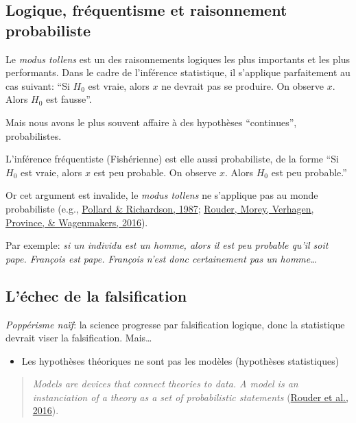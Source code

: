 \documentclass[
  a4paper,11pt,twoside,onecolumn,openright,final,oldfontcommands]{memoir}
\providecommand{\tightlist}{%
  \setlength{\itemsep}{0pt}\setlength{\parskip}{0pt}}
\theoremstyle{definition}
\theoremstyle{definition}
\theoremstyle{definition}
\theoremstyle{remark}
\begin{document}
\hypertarget{logique-fruxe9quentisme-et-raisonnement-probabiliste}{%
\subsection{Logique, fréquentisme et raisonnement probabiliste}\label{logique-fruxe9quentisme-et-raisonnement-probabiliste}}

Le \emph{modus tollens} est un des raisonnements logiques les plus importants et les plus performants. Dans le cadre de l'inférence statistique, il s'applique parfaitement au cas suivant: ``Si \(H_{0}\) est vraie, alors \(x\) ne devrait pas se produire. On observe \(x\). Alors \(H_{0}\) est fausse''.

Mais nous avons le plus souvent affaire à des hypothèses ``continues'', probabilistes.

L'inférence fréquentiste (Fishérienne) est elle aussi probabiliste, de la forme ``Si \(H_{0}\) est vraie, alors \(x\) est peu probable. On observe \(x\). Alors \(H_{0}\) est peu probable.''

Or cet argument est invalide, le \emph{modus tollens} ne s'applique pas au monde probabiliste (e.g., \href{http://citeseerx.ist.psu.edu/viewdoc/download?doi=10.1.1.505.9968\&rep=rep1\&type=pdf}{Pollard \& Richardson, 1987}; \href{http://www.ejwagenmakers.com/2016/RouderEtAl2016FreeLunch.pdf}{Rouder, Morey, Verhagen, Province, \& Wagenmakers, 2016}).

Par exemple: \emph{si un individu est un homme, alors il est peu probable qu'il soit pape. François est pape. François n'est donc certainement pas un homme\ldots{}}

\hypertarget{luxe9chec-de-la-falsification}{%
\subsection{L'échec de la falsification}\label{luxe9chec-de-la-falsification}}

\emph{Poppérisme naïf}: la science progresse par falsification logique, donc la statistique devrait viser la falsification. Mais\ldots{}

\begin{itemize}
\tightlist
\item
  Les hypothèses théoriques ne sont pas les modèles (hypothèses statistiques)
\end{itemize}

\begin{quote}
\emph{Models are devices that connect theories to data. A model is an instanciation of a theory as a set of probabilistic statements} (\href{https://www.collabra.org/articles/10.1525/collabra.28/}{Rouder et al., 2016}).
\end{quote}
\end{document}
